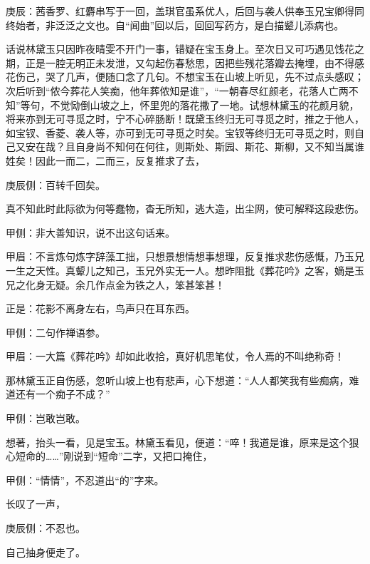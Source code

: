 

\begin{parag}
    \begin{note}庚辰：茜香罗、红麝串写于一回，盖琪官虽系优人，后回与袭人供奉玉兄宝卿得同终始者，非泛泛之文也。自“闻曲”回以后，回回写药方，是白描颦儿添病也。\end{note}
\end{parag}


\begin{parag}
    话说林黛玉只因昨夜晴雯不开门一事，错疑在宝玉身上。至次日又可巧遇见饯花之期，正是一腔无明正未发泄，又勾起伤春愁思，因把些残花落瓣去掩埋，由不得感花伤己，哭了几声，便随口念了几句。不想宝玉在山坡上听见，先不过点头感叹；次后听到“侬今葬花人笑痴，他年葬侬知是谁”，“一朝春尽红颜老，花落人亡两不知”等句，不觉恸倒山坡之上，怀里兜的落花撒了一地。试想林黛玉的花颜月貌，将来亦到无可寻觅之时，宁不心碎肠断！既黛玉终归无可寻觅之时，推之于他人，如宝钗、香菱、袭人等，亦可到无可寻觅之时矣。宝钗等终归无可寻觅之时，则自己又安在哉？且自身尚不知何在何往，则斯处、斯园、斯花、斯柳，又不知当属谁姓矣！因此一而二，二而三，反复推求了去，\begin{note}庚辰侧：百转千回矣。\end{note}真不知此时此际欲为何等蠢物，杳无所知，逃大造，出尘网，使可解释这段悲伤。\begin{note}甲侧：非大善知识，说不出这句话来。\end{note}\begin{note}甲眉：不言炼句炼字辞藻工拙，只想景想情想事想理，反复推求悲伤感慨，乃玉兄一生之天性。真颦儿之知己，玉兄外实无一人。想昨阻批《葬花吟》之客，嫡是玉兄之化身无疑。余几作点金为铁之人，笨甚笨甚！\end{note}正是：花影不离身左右，鸟声只在耳东西。\begin{note}甲侧：二句作禅语参。\end{note}\begin{note}甲眉：一大篇《葬花吟》却如此收拾，真好机思笔仗，令人焉的不叫绝称奇！\end{note}
\end{parag}


\begin{parag}
    那林黛玉正自伤感，忽听山坡上也有悲声，心下想道：“人人都笑我有些痴病，难道还有一个痴子不成？”\begin{note}甲侧：岂敢岂敢。\end{note}想著，抬头一看，见是宝玉。林黛玉看见，便道：“啐！我道是谁，原来是这个狠心短命的……”刚说到“短命”二字，又把口掩住，\begin{note}甲侧：“情情”，不忍道出“的”字来。\end{note}长叹了一声，\begin{note}庚辰侧：不忍也。\end{note}自己抽身便走了。
\end{parag}



